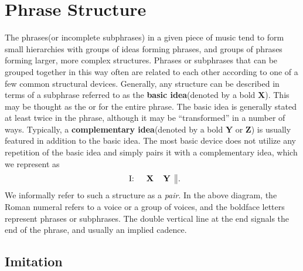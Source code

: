\section{Phrase Structure}

The phrases(or incomplete subphrases) in a given piece of music tend to form small hierarchies with groups of ideas forming phrases, and groups of phrases forming larger, more complex structures. Phrases or subphrases that can be grouped together in this way often are related to each other according to one of a few common structural devices. Generally, any structure can be described in terms of a subphrase referred to as the \textbf{basic idea}(denoted by a bold \textbf{X}). This may be thought as the  or  for the entire phrase. The basic idea is generally stated at least twice in the phrase, although it may be ``transformed'' in a number of ways. Typically, a \textbf{complementary idea}(denoted by a bold \textbf{Y} or \textbf{Z}) is usually featured in addition to the basic idea. The most basic device does not utilize any repetition of the basic idea and simply pairs it with a complementary idea, which we represent as
\begin{equation*}\label{fig:imitation_a}
\begin{tabular}{rcc||}
  I: \quad & \textbf{X} & \textbf{Y} \\
\end{tabular} \, .
\end{equation*}
We informally refer to such a structure as a \textit{pair}. In the above diagram, the Roman numeral refers to a voice or a group of voices, and the boldface letters represent phrases or subphrases. The double vertical line at the end signals the end of the phrase, and usually an implied cadence.

\subsection{Imitation}


